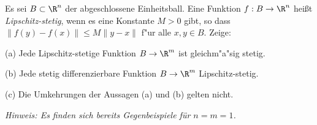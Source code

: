 \begin{prob}
Es sei $B\subset\R^n$ der abgeschlossene Einheitsball. Eine Funktion
$f:B\to \R^n$ hei\ss t {\em Lipschitz-stetig}, wenn es eine Konstante
$M>0$ gibt, so dass $\|f(y)-f(x)\|\leq M\|y-x\|$ f"ur alle $x,y\in B$. Zeige:

(a) Jede Lipschitz-stetige Funktion $B\to\R^m$ ist gleichm"a"sig stetig.

(b) Jede stetig differenzierbare Funktion $B\to\R^m$ Lipschitz-stetig.

(c) Die Umkehrungen der Aussagen (a) und (b) gelten nicht.

\it{Hinweis: Es finden sich bereits Gegenbeispiele f\"ur $n=m=1$.}
\end{prob}
